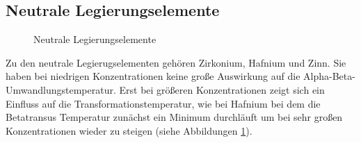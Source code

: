 \documentclass[a4paper, 11pt]{tubsreprt}
\begin{document}
\subsection{Neutrale Legierungselemente}
\begin{figure}[h]
\caption{Neutrale Legierungselemente}
\label{Abbildung neutrale legierungselemente}
\end{figure}

Zu den neutrale Legierugselementen gehören Zirkonium, Hafnium und Zinn. Sie haben bei niedrigen Konzentrationen keine große Auswirkung auf die Alpha-Beta-Umwandlungstemperatur. Erst bei größeren Konzentrationen zeigt sich ein Einfluss auf die Transformationstemperatur, wie bei Hafnium bei dem die Betatransus Temperatur zunächst ein Minimum durchläuft um bei sehr großen Konzentrationen wieder zu steigen \cite{Luetjering2007} (siehe Abbildungen \ref{Abbildung neutrale legierungselemente}).
\newpage
\end{document}
